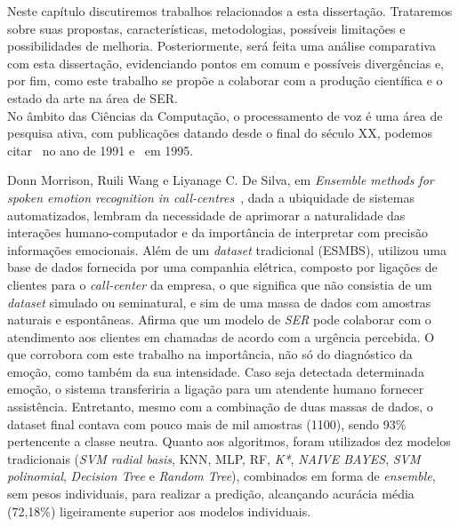
Neste capítulo discutiremos trabalhos relacionados a esta dissertação. Trataremos sobre suas propostas, características, metodologias, possíveis limitações e possibilidades de melhoria. Posteriormente, será feita uma análise comparativa com esta dissertação, evidenciando pontos em comum e possíveis divergências e, por fim, como este trabalho se propõe a colaborar com a produção científica e o estado da arte na área de \acrshort{SER}.\\


No âmbito das Ciências da Computação, o processamento de voz é uma área de pesquisa ativa, com publicações datando desde o final do século XX, podemos citar~\cite{12.27} no ano de 1991 e~\cite{12.28} em 1995.


Donn Morrison, Ruili Wang e Liyanage C. De Silva, em \textit{Ensemble methods for spoken emotion recognition in call-centres}~\cite{32.32}, dada a ubiquidade de sistemas automatizados, lembram da necessidade de aprimorar a naturalidade das interações humano-computador e da importância de interpretar com precisão informações emocionais. Além de um \textit{dataset} tradicional (ESMBS), utilizou uma base de dados fornecida por uma companhia elétrica, composto por ligações de clientes para o \textit{call-center} da empresa, o que significa que não consistia de um \textit{dataset} simulado ou seminatural, e sim de uma massa de dados com amostras naturais e espontâneas. Afirma que um modelo de \textit{SER} pode colaborar com o atendimento aos clientes em chamadas de acordo com a urgência percebida. O que corrobora com este trabalho na importância, não só do diagnóstico da emoção, como também da sua intensidade. Caso seja detectada determinada emoção, o sistema transferiria a ligação para um atendente humano fornecer assistência. Entretanto, mesmo com a combinação de duas massas de dados, o dataset final contava com pouco mais de mil amostras (1100), sendo 93\% pertencente a classe neutra. Quanto aos algoritmos, foram utilizados dez modelos tradicionais (\textit{SVM radial basis}, \acrshort{KNN}, \acrshort{MLP}, \acrshort{RF}, \textit{K*}, \textit{NAIVE BAYES}, \textit{SVM polinomial}, \textit{Decision Tree} e \textit{Random Tree}), combinados em forma de \textit{ensemble}, sem pesos individuais, para realizar a predição, alcançando acurácia média (72,18\%) ligeiramente superior aos modelos individuais.

